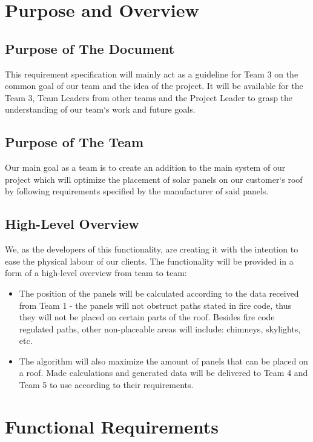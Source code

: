 \documentclass[a4paper,12pt,fleqn]{article}
\begin{document}
\section{Purpose and Overview}

\subsection{Purpose of The Document}

This requirement specification will mainly act as a guideline for Team 3 on the common goal of our team and the idea of the project. It will be available for the Team 3, Team Leaders from other teams and the Project Leader to grasp the understanding of our team‘s work and future goals. 

\subsection{Purpose of The Team}
Our main goal as a team is to create an addition to the main system of our project which will optimize the placement of solar panels on our customer‘s roof by following requirements specified by the manufacturer of said panels. 

\subsection{High-Level Overview}
We, as the developers of this functionality, are creating it with the intention to ease the physical labour of our clients. The functionality will be provided in a form of a high-level overview from team to team: 

\begin{itemize}
    \item The position of the panels will be calculated according to the data received from Team 1 - the panels will not obstruct paths stated in fire code, thus they will not be placed on certain parts of the roof. Besides fire code regulated paths, other non-placeable areas will include: chimneys, skylights, etc.
    
    \item The algorithm will also maximize the amount of panels that can be placed on a roof. Made calculations and generated data will be delivered to Team 4 and Team 5 to use according to their requirements. 
\end{itemize}

\newpage

\section{Functional Requirements}
\end{document}
